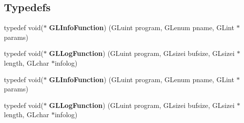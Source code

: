 \subsection*{Typedefs}
\begin{DoxyCompactItemize}
\item 
\mbox{\label{group__renderer_ga43f064a41d0e842a9d44cc240d3f02c7}} 
typedef void($\ast$ {\bfseries G\+L\+Info\+Function}) (G\+Luint program, G\+Lenum pname, G\+Lint $\ast$params)
\item 
\mbox{\label{group__renderer_ga4d3309d284a691b970161147abbf4c8f}} 
typedef void($\ast$ {\bfseries G\+L\+Log\+Function}) (G\+Luint program, G\+Lsizei bufsize, G\+Lsizei $\ast$length, G\+Lchar $\ast$infolog)
\item 
\mbox{\label{group__renderer_ga43f064a41d0e842a9d44cc240d3f02c7}} 
typedef void($\ast$ {\bfseries G\+L\+Info\+Function}) (G\+Luint program, G\+Lenum pname, G\+Lint $\ast$params)
\item 
\mbox{\label{group__renderer_ga4d3309d284a691b970161147abbf4c8f}} 
typedef void($\ast$ {\bfseries G\+L\+Log\+Function}) (G\+Luint program, G\+Lsizei bufsize, G\+Lsizei $\ast$length, G\+Lchar $\ast$infolog)
\end{DoxyCompactItemize}
